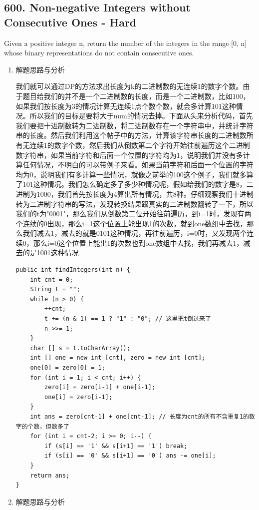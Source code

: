 \documentclass[9pt, b5paaper]{book}
\begin{document}
\subsection{600. Non-negative Integers without Consecutive Ones - Hard}
\label{sec-1-4-15}
Given a positive integer n, return the number of the integers in the range [0, n] whose binary representations do not contain consecutive ones.
\begin{enumerate}
\item 解题思路与分析
\label{sec-1-4-15-1}

我们就可以通过DP的方法求出长度为k的二进制数的无连续1的数字个数。由于题目给我们的并不是一个二进制数的长度，而是一个二进制数，比如100，如果我们按长度为3的情况计算无连续1点个数个数，就会多计算101这种情况。所以我们的目标是要将大于num的情况去掉。下面从头来分析代码，首先我们要把十进制数转为二进制数，将二进制数存在一个字符串中，并统计字符串的长度。然后我们利用这个帖子中的方法，计算该字符串长度的二进制数所有无连续1的数字个数，然后我们从倒数第二个字符开始往前遍历这个二进制数字符串，如果当前字符和后面一个位置的字符均为1，说明我们并没有多计算任何情况，不明白的可以带例子来看。如果当前字符和后面一个位置的字符均为0，说明我们有多计算一些情况，就像之前举的100这个例子，我们就多算了101这种情况。我们怎么确定多了多少种情况呢，假如给我们的数字是8，二进制为1000，我们首先按长度为4算出所有情况，共8种。仔细观察我们十进制转为二进制字符串的写法，发现转换结果跟真实的二进制数翻转了一下，所以我们的t为"0001"，那么我们从倒数第二位开始往前遍历，到i=1时，发现有两个连续的0出现，那么i=1这个位置上能出现1的次数，就到one数组中去找，那么我们减去1，减去的就是0101这种情况，再往前遍历，i=0时，又发现两个连续0，那么i=0这个位置上能出1的次数也到one数组中去找，我们再减去1，减去的是1001这种情况

\begin{verbatim}
public int findIntegers(int n) {
    int cnt = 0;
    String t = "";
    while (n > 0) {
        ++cnt;
        t += (n & 1) == 1 ? "1" : "0"; // 这里把t倒过来了
        n >>= 1;
    }
    char [] s = t.toCharArray();
    int [] one = new int [cnt], zero = new int [cnt];
    one[0] = zero[0] = 1;
    for (int i = 1; i < cnt; i++) {
        zero[i] = zero[i-1] + one[i-1];
        one[i] = zero[i-1];
    }
    int ans = zero[cnt-1] + one[cnt-1]; // 长度为cnt的所有不含重复1的数字的个数，但数多了
    for (int i = cnt-2; i >= 0; i--) {
        if (s[i] == '1' && s[i+1] == '1') break;
        if (s[i] == '0' && s[i+1] == '0') ans -= one[i];
    }
    return ans;
}
\end{verbatim}
\item 解题思路与分析
\label{sec-1-4-15-2}


\end{enumerate}
\end{document}
